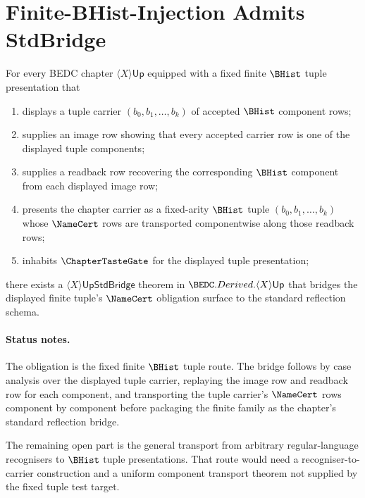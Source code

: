 \section{Finite-BHist-Injection Admits StdBridge}
\label{sec:conjectures-finite-bhist-injection-admits-stdbridge}

\begin{conjecture}
\label{conj:finite-bhist-injection-admits-stdbridge}
For every BEDC chapter $\langle X\rangle\mathsf{Up}$ equipped with a fixed finite $\BHist$ tuple presentation that
\begin{enumerate}
  \item displays a tuple carrier $(b_0,b_1,\ldots,b_k)$ of accepted $\BHist$ component rows;
  \item supplies an image row showing that every accepted carrier row is one of the displayed tuple components;
  \item supplies a readback row recovering the corresponding $\BHist$ component from each displayed image row;
  \item presents the chapter carrier as a fixed-arity $\BHist$ tuple $(b_0,b_1,\ldots,b_k)$ whose $\NameCert$ rows are transported componentwise along those readback rows;
  \item inhabits $\ChapterTasteGate$ for the displayed tuple presentation;
\end{enumerate}
there exists a $\langle X\rangle\mathsf{UpStdBridge}$ theorem in $\BEDC.Derived.\langle X\rangle\mathsf{Up}$ that bridges the displayed finite tuple's $\NameCert$ obligation surface to the standard reflection schema.
\end{conjecture}


\paragraph{Status notes.}
The obligation is the fixed finite $\BHist$ tuple route. The bridge follows by case analysis over the displayed tuple carrier, replaying the image row and readback row for each component, and transporting the tuple carrier's $\NameCert$ rows component by component before packaging the finite family as the chapter's standard reflection bridge.

The remaining open part is the general transport from arbitrary
regular-language recognisers to $\BHist$ tuple presentations. That route
would need a recogniser-to-carrier construction and a uniform component
transport theorem not supplied by the fixed tuple test target.

